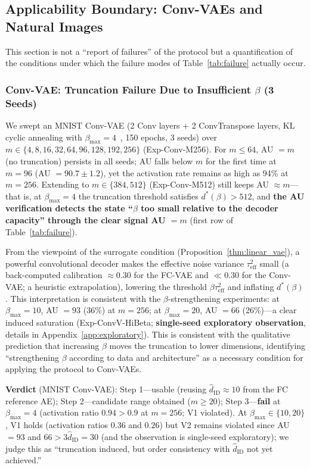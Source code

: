 \documentclass[make,article,submit,pdftex,moreauthors]{Definitions/mdpi}
\newcommand{\hatdID}{\hat{d}_{\mathrm{ID}}}
\newcommand{\dstar}{d^{*}(\beta)}
\begin{document}
\subsection{Applicability Boundary: Conv-VAEs and Natural Images}\label{sec:exp_boundary}

This section is not a ``report of failures'' of the protocol but a
quantification of the conditions under which the failure modes of
Table~\ref{tab:failure} actually occur.

\subsubsection{Conv-VAE: Truncation Failure Due to Insufficient $\beta$ (3 Seeds)}

We swept an MNIST Conv-VAE (2 Conv layers + 2 ConvTranspose layers, KL
cyclic annealing with $\beta_{\max} = 4$~\cite{fu2019cyclical}, 150 epochs,
3 seeds) over $m \in \{4, 8, 16, 32, 64, 96, 128, 192, 256\}$
(Exp-Conv-M256).
For $m \leq 64$, AU $= m$ (no truncation) persists in all seeds; AU falls
below $m$ for the first time at $m = 96$ (AU $= 90.7 \pm 1.2$), yet the
activation rate remains as high as 94\% at $m = 256$.
Extending to $m \in \{384, 512\}$ (Exp-Conv-M512) still keeps
AU $\approx m$---that is, at $\beta_{\max} = 4$ the truncation threshold
satisfies $\dstar > 512$, and \textbf{the AU verification detects the state
``$\beta$ too small relative to the decoder capacity'' through the clear
signal AU $= m$} (first row of Table~\ref{tab:failure}).

From the viewpoint of the surrogate condition
(Proposition~\ref{thm:linear_vae}), a powerful convolutional decoder makes
the effective noise variance $\tau^2_{\mathrm{eff}}$ small (a back-computed
calibration $\approx 0.30$ for the FC-VAE and $\ll 0.30$ for the Conv-VAE; a
heuristic extrapolation), lowering the threshold
$\beta\tau^2_{\mathrm{eff}}$ and inflating $\dstar$.
This interpretation is consistent with the $\beta$-strengthening
experiments: at $\beta_{\max} = 10$, AU $= 93$ (36\%) at $m = 256$; at
$\beta_{\max} = 20$, AU $= 66$ (26\%)---a clear induced saturation
(Exp-ConvV-HiBeta; \textbf{single-seed exploratory observation}, details in
Appendix~\ref{app:exploratory}).
This is consistent with the qualitative prediction that increasing $\beta$
moves the truncation to lower dimensions, identifying ``strengthening
$\beta$ according to data and architecture'' as a necessary condition for
applying the protocol to Conv-VAEs.

\textbf{Verdict} (MNIST Conv-VAE):
Step 1---usable (reusing $\hatdID \approx 10$ from the FC reference AE);
Step 2---candidate range obtained ($m \geq 20$);
Step 3---\textbf{fail} at $\beta_{\max} = 4$ (activation ratio
$0.94 > 0.9$ at $m = 256$; V1 violated).
At $\beta_{\max} \in \{10, 20\}$, V1 holds (activation ratios $0.36$ and
$0.26$) but V2 remains violated since AU $= 93$ and
$66 > 3\hatdID = 30$ (and the observation is single-seed exploratory);
we judge this as ``truncation induced, but order consistency with $\hatdID$
not yet achieved.''
\end{document}
